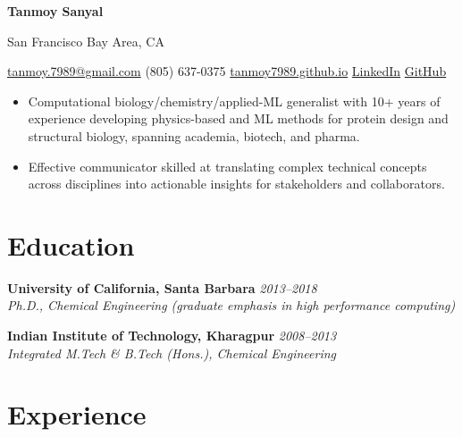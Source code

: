 \documentclass[9pt, letterpaper]{article}
\newcommand{\jobtitle}[1]{\textit{#1}}
\newcommand{\daterange}[1]{\textit{\color{muted}#1}}
\newcommand{\contactsep}{\enspace\textcolor{rulegray}{\textbullet}\enspace}
\begin{document}
{\fontsize{20}{24}\selectfont\color{accent}\textbf{Tanmoy Sanyal}}

\vspace{5pt}
{\color{muted}San Francisco Bay Area, CA}

\vspace{4pt}
{\small
  \href{mailto:tanmoy.7989@gmail.com}{tanmoy.7989@gmail.com}\contactsep
  (805) 637-0375\contactsep
  \href{https://tanmoy7989.github.io}{tanmoy7989.github.io}\contactsep
  \href{https://linkedin.com/in/tanmoy-sanyal}{LinkedIn}\contactsep
  \href{https://github.com/tanmoy7989}{GitHub}
}

\vspace{4pt}
{\color{muted}\linespread{1.08}\selectfont

\begin{itemize}
    \item Computational biology/chemistry/applied-ML generalist with 10+ years of experience developing physics-based and ML methods for protein design and structural biology, spanning academia, biotech, and pharma.

    \item Effective communicator skilled at translating complex technical concepts across disciplines into actionable insights for stakeholders and collaborators.
\end{itemize}

\section{Education}

\textbf{University of California, Santa Barbara} \hfill \daterange{2013--2018} \\
\jobtitle{Ph.D., Chemical Engineering (graduate emphasis in high performance computing)}

\vspace{6pt}
\textbf{Indian Institute of Technology, Kharagpur} \hfill \daterange{2008--2013} \\
\jobtitle{Integrated M.Tech \& B.Tech (Hons.), Chemical Engineering}

\section{Experience}

}
\end{document}
